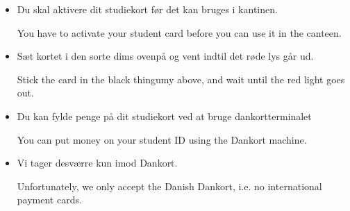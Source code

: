 \documentclass{article}
\begin{document}

\maketitle

\null

\vspace{-1.7cm}

\huge


\vspace{-1cm}

\begin{itemize}

\dansk

\item Du skal aktivere dit studiekort før det kan bruges i kantinen.

\english You have to activate your student card before you can use it in the
canteen.

\dansk

\item Sæt kortet i den sorte dims ovenpå og vent indtil det røde lys går ud.

\english Stick the card in the black thingumy above, and wait until the red
light goes out.

\end{itemize}


\vspace{-1cm}

\begin{itemize}

\dansk

\item Du kan fylde penge på dit studiekort ved at bruge dankortterminalet

\english You can put money on your student ID using the Dankort machine. \dansk

\item Vi tager desværre kun imod Dankort.

\english

Unfortunately, we only accept the Danish Dankort, i.e. no international payment
cards.

\end{itemize}

\dansk

\underskriv
\end{document}
